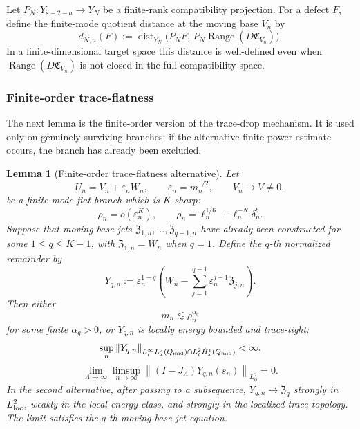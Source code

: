 \documentclass[11pt]{article}
\numberwithin{equation}{section}
\theoremstyle{plain}
\newtheorem{lemma}{Lemma}[section]
\theoremstyle{definition}
\theoremstyle{remark}
\DeclareMathOperator{\Range}{Range}
\DeclareMathOperator{\dist}{dist}
\newcommand{\eps}{\varepsilon}
\newcommand{\norm}[2]{\left\|#1\right\|_{#2}}
\newcommand{\calC}{\mathfrak C}
\newcommand{\frakZ}{\mathfrak Z}
\begin{document}
Let \(P_N:Y_{s-2-a}\to Y_N\) be a finite-rank compatibility projection.  For a defect
\(F\), define the finite-mode quotient distance at the moving base \(V_n\) by
\begin{equation}\label{pIV:eq:finite-mode-distance}
        d_{N,n}(F):=
        \dist_{Y_N}\bigl(P_NF,\,P_N\Range(D\calC_{V_n})\bigr).
\end{equation}
In a finite-dimensional target space this distance is well-defined even when
\(\Range(D\calC_{V_n})\) is not closed in the full compatibility space.

\subsubsection{Finite-order trace-flatness}

The next lemma is the finite-order version of the trace-drop mechanism.  It is used
only on genuinely surviving branches; if the alternative finite-power estimate occurs,
the branch has already been excluded.

\begin{lemma}[Finite-order trace-flatness alternative]\label{pIV:lem:G-trace-flatness}
Let
\[
        U_n=V_n+\eps_nW_n,
        \qquad \eps_n=m_n^{1/2},
        \qquad V_n\to V\ne0,
\]
be a finite-mode flat branch which is \(K\)-sharp:
\begin{equation}\label{pIV:eq:K-sharp}
        \rho_n=o(\eps_n^K),
        \qquad
        \rho_n=\ell_n^{1/6}+\ell_n^{-N}\delta_n^b .
\end{equation}
Suppose that moving-base jets \(\frakZ_{1,n},\ldots,\frakZ_{q-1,n}\) have already
been constructed for some \(1\le q\le K-1\), with \(\frakZ_{1,n}=W_n\) when
\(q=1\).  Define the \(q\)-th normalized remainder by
\begin{equation}\label{pIV:eq:Yq-def}
        Y_{q,n}:=
        \eps_n^{1-q}
        \left(W_n-
        \sum_{j=1}^{q-1}\eps_n^{j-1}\frakZ_{j,n}\right).
\end{equation}
Then either
\begin{equation}\label{pIV:eq:finite-power-alternative-q}
        m_n\lesssim \rho_n^{\alpha_q}
\end{equation}
for some finite \(\alpha_q>0\), or \(Y_{q,n}\) is locally energy bounded and
trace-tight:
\begin{equation}\label{pIV:eq:Yq-energy-bound}
        \sup_n
        \norm{Y_{q,n}}{L^\infty_tL^2_x(Q_{\rm mid})
        \cap L^2_t\dot H^1_x(Q_{\rm mid})}<\infty,
\end{equation}
\begin{equation}\label{pIV:eq:Yq-trace-tight}
        \lim_{\Lambda\to\infty}\limsup_{n\to\infty}
        \norm{(I-J_\Lambda)Y_{q,n}(s_n)}{L^2_\phi}=0.
\end{equation}
In the second alternative, after passing to a subsequence,
\(Y_{q,n}\to\frakZ_{q}\) strongly in \(L^2_{\rm loc}\), weakly in the local energy
class, and strongly in the localized trace topology.  The limit satisfies the
\(q\)-th moving-base jet equation.
\end{lemma}
\end{document}
